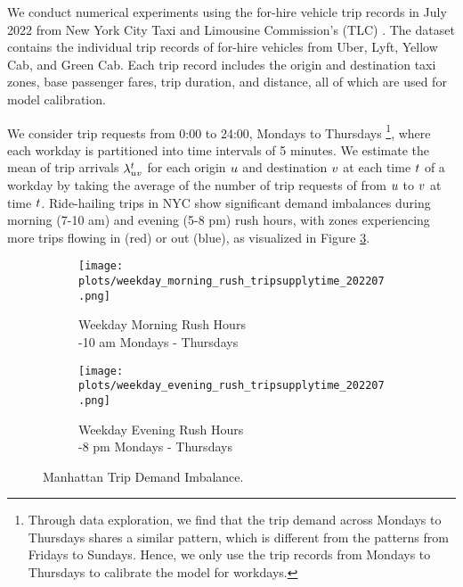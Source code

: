 We conduct numerical experiments using the for-hire vehicle trip records in July 2022 from New York City Taxi and Limousine Commission’s (TLC) \cite{nyctlc}. The dataset contains the individual trip records of for-hire vehicles from Uber, Lyft, Yellow Cab, and Green Cab. Each trip record includes the origin and destination taxi zones, base passenger fares, trip duration, and distance, all of which are used for model calibration.

We consider trip requests from 0:00 to 24:00, Mondays to Thursdays \footnote{Through data exploration, we find that the trip demand across Mondays to Thursdays shares a similar pattern, which is different from the patterns from Fridays to Sundays. Hence, we only use the trip records from Mondays to Thursdays to calibrate the model for workdays.}, where each workday is partitioned into time intervals of 5 minutes. We estimate the mean of trip arrivals $\lambda_{uv}^{t}$ for each origin $u$ and destination $v$ at each time $t$ of a workday by taking the average of the number of trip requests of from $u$ to $v$ at time $t$. Ride-hailing trips in NYC show significant demand imbalances during morning (7-10 am) and evening (5-8 pm) rush hours, with zones experiencing more trips flowing in (red) or out (blue), as visualized in Figure \ref{fig:manhattan-demand}.

\begin{figure}[h]
    \centering
    \begin{subfigure}{0.4\linewidth}
        \centering
        \texttt{[image: plots/weekday\_morning\_rush\_tripsupplytime\_202207.png]}
        \caption{Weekday Morning Rush Hours\\-10 am Mondays - Thursdays}
        \label{fig:manhattan-demand-morning-rush}
    \end{subfigure}%
    \begin{subfigure}{0.4\linewidth}
        \centering
        \texttt{[image: plots/weekday\_evening\_rush\_tripsupplytime\_202207.png]}
        \caption{Weekday Evening Rush Hours\\-8 pm Mondays - Thursdays}
        \label{fig:manhattan-demand-evening-rush}
    \end{subfigure}
    \caption{Manhattan Trip Demand Imbalance.}
    \label{fig:manhattan-demand}
\end{figure}

